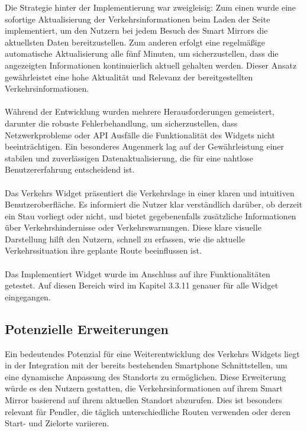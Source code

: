 \noindent
Die Strategie hinter der Implementierung war zweigleisig: Zum einen wurde eine sofortige Aktualisierung der Verkehrsinformationen beim Laden der Seite implementiert, um den Nutzern bei jedem Besuch des Smart Mirrors die aktuellsten Daten bereitzustellen. Zum anderen erfolgt eine regelmäßige automatische Aktualisierung alle fünf Minuten, um sicherzustellen, dass die angezeigten Informationen kontinuierlich aktuell gehalten werden. Dieser Ansatz gewährleistet eine hohe Aktualität und Relevanz der bereitgestellten Verkehrsinformationen. \\ \\
\noindent
Während der Entwicklung wurden mehrere Herausforderungen gemeistert, darunter die robuste Fehlerbehandlung, um sicherzustellen, dass Netzwerkprobleme oder API Ausfälle die Funktionalität des Widgets nicht beeinträchtigen. Ein besonderes Augenmerk lag auf der Gewährleistung einer stabilen und zuverlässigen Datenaktualisierung, die für eine nahtlose Benutzererfahrung entscheidend ist. \\ \\
\noindent
Das Verkehrs Widget präsentiert die Verkehrslage in einer klaren und intuitiven Benutzeroberfläche. Es informiert die Nutzer klar verständlich darüber, ob derzeit ein Stau vorliegt oder nicht, und bietet gegebenenfalls zusätzliche Informationen über Verkehrshindernisse oder Verkehrswarnungen. Diese klare visuelle Darstellung hilft den Nutzern, schnell zu erfassen, wie die aktuelle Verkehrssituation ihre geplante Route beeinflussen ist. \\ \\
\noindent
Das Implementiert Widget wurde im Anschluss auf ihre Funktionalitäten getestet. Auf diesen Bereich wird im Kapitel 3.3.11 genauer für alle Widget eingegangen.

\subsection{Potenzielle Erweiterungen}
Ein bedeutendes Potenzial für eine Weiterentwicklung des Verkehrs Widgets liegt in der Integration mit der bereits bestehenden Smartphone Schnittstellen, um eine dynamische Anpassung des Standorts zu ermöglichen. Diese Erweiterung würde es den Nutzern gestatten, die Verkehrsinformationen auf ihrem Smart Mirror basierend auf ihrem aktuellen Standort abzurufen. Dies ist besonders relevant für Pendler, die täglich unterschiedliche Routen verwenden oder deren Start- und Zielorte variieren.


